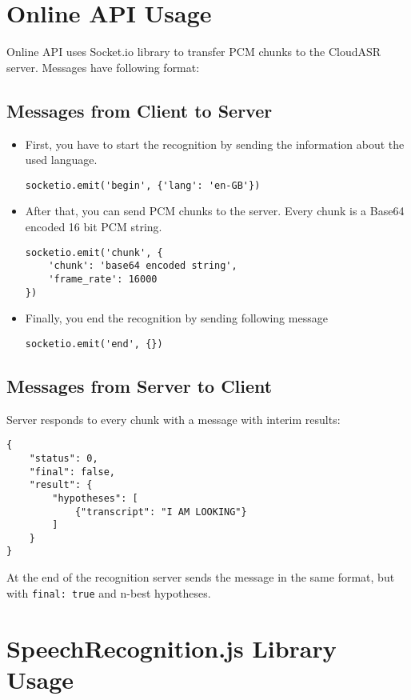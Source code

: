 \section{Online API Usage}

Online API uses Socket.io library to transfer PCM chunks to the CloudASR server.
Messages have following format:

\subsection{Messages from Client to Server}

\begin{itemize}
  \item
    First, you have to start the recognition by sending the information about the used language.
    \begin{verbatim}socketio.emit('begin', {'lang': 'en-GB'})\end{verbatim}
  \item
    After that, you can send PCM chunks to the server. Every chunk is a Base64 encoded 16 bit PCM string.
\begin{verbatim}
socketio.emit('chunk', {
    'chunk': 'base64 encoded string',
    'frame_rate': 16000
})
\end{verbatim}
  \item
    Finally, you end the recognition by sending following message
    \begin{verbatim}socketio.emit('end', {})\end{verbatim}
\end{itemize}

\subsection{Messages from Server to Client}

Server responds to every chunk with a message with interim results:

\begin{verbatim}{
    "status": 0,
    "final": false,
    "result": {
        "hypotheses": [
            {"transcript": "I AM LOOKING"}
        ]
    }
}\end{verbatim}

At the end of the recognition server sends the message in the same format,
  but with \texttt{final: true} and n-best hypotheses.

\section{SpeechRecognition.js Library Usage}

